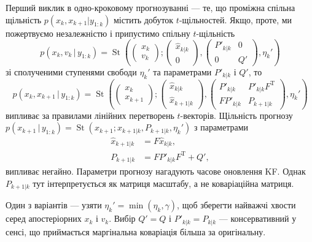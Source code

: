 \documentclass[]{article}
\newcommand{\kpk}{_{k+1|k}}
\renewcommand{\k}{_k}
\newcommand{\kk}{_{k|k}}
\newcommand{\kp}{_{k+1}}
\newcommand{\otk}{_{1:k}}
\newcommand{\gvn}{\,|\,}
\newcommand{\xh}{\hat x}
\newcommand{\bbm}{\begin{pmatrix}}
\newcommand{\ebm}{\end{pmatrix}}
\newcommand{\T}{^{\mathrm{T}}}
\DeclareMathOperator{\St}{St}
\begin{document}
Перший виклик в одно-кроковому прогнозуванні — те, що проміжна спільна щільність $p(x\k,x\kp|y\otk)$ містить добуток $t$-щільностей. Якщо, проте, ми пожертвуємо незалежністю і припустимо спільну $t$-щільність
\begin{equation}\label{eq:assumedStateProcessNoise}
p(x_k, v\k \gvn y\otk) = \St\left( \bbm x_k\\ v\k \ebm; \bbm \xh\kk\\ 0 \ebm, \bbm P'\kk & 0\\ 0 & Q'\ebm, \eta_k'\right)
\end{equation}
зі сполученими ступенями свободи $\eta_k'$ та параметрами $P'\kk$ і $Q'$, то
\begin{equation}\label{eq:assumedJointPred}
p(x_k, x\kp \gvn y\otk) = \St\left( \bbm x_k\\ x\kp \ebm; \bbm \xh\kk \\ \xh\kpk \ebm, \bbm P'\kk & P'\kk F\T\\ FP'\kk & P\kpk\ebm, \eta_k'\right)
\end{equation}
випливає за правилами лінійних перетворень $t$-векторів. Щільність прогнозу $p(x\kp \gvn y\otk)=\St(x\kp; \xh\kpk, P\kpk, \eta\k')$ з параметрами
\begin{subequations}
\begin{align}
\xh\kpk &= F\xh\kk,\\
P\kpk &= FP'\kk F\T + Q',
\end{align}
\end{subequations}
випливає негайно. Параметри прогнозу нагадують часове оновлення KF. Однак $P\kpk$ тут інтерпретується як матриця масштабу, а не коваріаційна матриця.

Один з варіантів — узяти $\eta\k'=\min(\eta\k, \gamma)$, щоб зберегти найважчі хвости серед апостеріорних $x\k$ і $v\k$. Вибір $Q'=Q$ і $P'\kk=P\kk$ — консервативний у сенсі, що приймається маргінальна коваріація більша за оригінальну.
\end{document}
